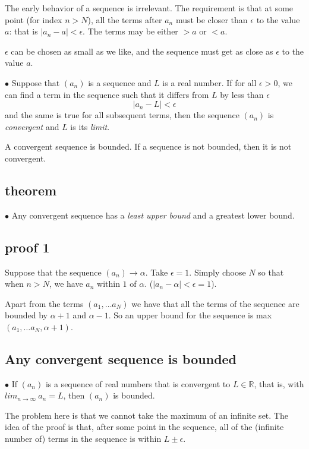 \documentclass[11pt, oneside]{article}
\begin{document}
The early behavior of a sequence is irrelevant.  The requirement is that at some point (for index $n > N$), all the terms after $a_n$ must be closer than $\epsilon$ to the value $a$:  that is $|a_n - a| < \epsilon$.  The terms may be either $> a$ or $< a$.

$\epsilon$ can be chosen as small as we like, and the sequence must get as close as $\epsilon$ to the value $a$.

$\bullet$  Suppose that $(a_n)$ is a sequence and $L$ is a real number. If for all $\epsilon > 0$, we can find a term in the sequence such that it differs from $L$ by less than $\epsilon$ 
\[ |a_n - L | < \epsilon \]
and the same is true for all subsequent terms, then the sequence $(a_n)$ is \emph{convergent} and $L$ is its \emph{limit}.

A convergent sequence is bounded.  If a sequence is not bounded, then it is not convergent.

\subsection*{theorem}

$\bullet$ Any convergent sequence has a \emph{least upper bound} and a greatest lower bound.

\subsection*{proof 1}

Suppose that the sequence $(a_n) \rightarrow \alpha$.  Take $\epsilon = 1$.  Simply choose $N$ so that when $n > N$, we have $a_n$ within $1$ of $\alpha$.  ($|a_n - \alpha| < \epsilon = 1$).

Apart from the terms $(a_1, \dots a_N)$ we have that all the terms of the sequence are bounded by $\alpha + 1$ and $\alpha - 1$.  So an upper bound for the sequence is max$(a_1, \dots a_N, \alpha + 1)$.

\subsection*{Any convergent sequence is bounded}

$\bullet$  If $(a_n)$ is a sequence of real numbers that is convergent to $L \in \mathbb{R}$, that is, with $lim_{n \rightarrow \infty} \ a_n = L$, then $(a_n)$ is bounded.

The problem here is that we cannot take the maximum of an infinite set.  The idea of the proof is that, after some point in the sequence, all of the (infinite number of) terms in the sequence is within $L \pm \epsilon$.
\end{document}
